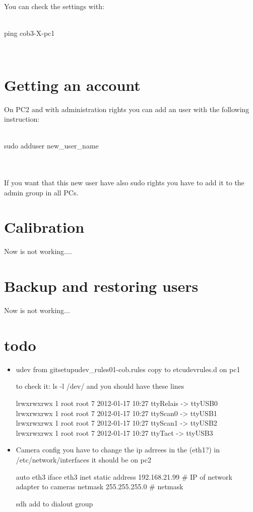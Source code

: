 You can check the settings with:
\\
\\   \colorbox{light-gray}{
         \begin{minipage}{1.0\textwidth} 
		ping cob3-X-pc1
         \end{minipage}  } \\


\section{Getting an account}
On PC2 and with administration rights you can add an user with the following instruction:
\\
\\   \colorbox{light-gray}{
         \begin{minipage}{1.0\textwidth} 
		sudo adduser new\_user\_name
         \end{minipage}  } 
	\\
	\\
If you want that this new user have also sudo rights you have to add it to the admin group in all PCs.

\section{Calibration}
Now is not working....
\section{Backup and restoring users}   
Now is not working...    

\section{todo}
\begin{itemize}
\item {udev from git\/setup\/udev\_rules\/01-cob.rules copy to \/etc\/udev\/rules.d on pc1}

to check it: ls -l /dev/ and you should have these lines

lrwxrwxrwx 1 root root           7 2012-01-17 10:27 ttyRelais -> ttyUSB0\\
lrwxrwxrwx 1 root root           7 2012-01-17 10:27 ttyScan0 -> ttyUSB1\\
lrwxrwxrwx 1 root root           7 2012-01-17 10:27 ttyScan1 -> ttyUSB2\\
lrwxrwxrwx 1 root root           7 2012-01-17 10:27 ttyTact -> ttyUSB3\\



\item {Camera config you have to change the ip adrrees in the (eth1?) in /etc/network/interfaces it should be on pc2}


auto eth3
iface eth3 inet static
address 192.168.21.99   \# IP of network adapter to cameras
netmask 255.255.255.0   \# netmask

sdh add to dialout group

\end{itemize}